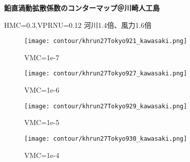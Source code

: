 \documentclass[fontsize=12pt,paper=a4]{jlreq}
\begin{document}
\textbf{鉛直渦動拡散係数のコンターマップ＠川崎人工島}

HMC=0.3,VPRNU=0.12 河川1.4倍、風力1.6倍
\begin{figure}
    \centering
    \texttt{[image: contour/khrun27Tokyo921\_kawasaki.png]}
    \caption{VMC=1e-7}
\end{figure}

\begin{figure}
    \centering
    \texttt{[image: contour/khrun27Tokyo927\_kawasaki.png]}
    \caption{VMC=1e-6}
\end{figure}

\begin{figure}
    \centering
    \texttt{[image: contour/khrun27Tokyo929\_kawasaki.png]}
    \caption{VMC=1e-5}
\end{figure}

\begin{figure}
    \centering
    \texttt{[image: contour/khrun27Tokyo930\_kawasaki.png]}
    \caption{VMC=1e-4}
\end{figure}
\end{document}
